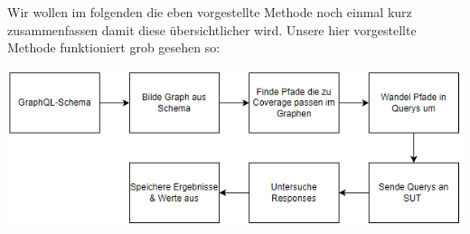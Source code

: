 Wir wollen im folgenden die eben vorgestellte Methode noch einmal kurz zusammenfassen damit diese übersichtlicher wird.
Unsere hier vorgestellte Methode funktioniert grob gesehen so:

\begin{center}
    \includegraphics[width=\textwidth,height=\textheight,keepaspectratio]{img/methode}
\end{center}

